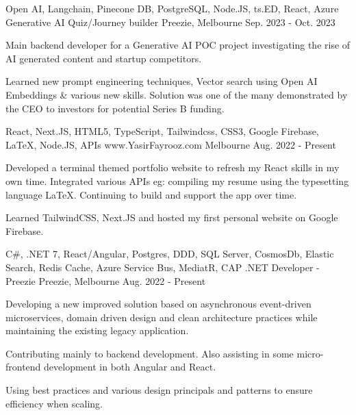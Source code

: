 

\vspace{-0.5\baselineskip}
\begin{cventries}
  \cventry
  {Open AI, Langchain, Pinecone DB, PostgreSQL, Node.JS, ts.ED, React, Azure}
  {Generative AI Quiz/Journey builder}
  {Preezie, Melbourne}
  {Sep. 2023 - Oct. 2023}
  {
    \begin{cvitems}
      \item {Main backend developer for a Generative AI POC project investigating the rise of AI generated content and startup competitors.}
      \item {Learned new prompt engineering techniques, Vector search using Open AI Embeddings & various new skills. Solution was one of the many demonstrated by the CEO to investors for potential Series B funding.}
    \end{cvitems}
  }
  \cventry
    {React, Next.JS, HTML5, TypeScript, Tailwindcss, CSS3, Google Firebase, LaTeX, Node.JS, APIs }
    {www.YasirFayrooz.com}
    {Melbourne}
    {Aug. 2022 - Present}
    {
      \begin{cvitems}
        \item {Developed a terminal themed portfolio website to refresh my React skills in my own time. Integrated various APIs eg: compiling my resume using the typesetting language LaTeX. Continuing to build and support the app over time.}
        \item {Learned TailwindCSS, Next.JS and hosted my first personal website on Google Firebase.}
      \end{cvitems}
    }
  \cventry
    {C\#, .NET 7, React/Angular, Postgres, DDD, SQL Server, CosmosDb, Elastic Search, Redis Cache, Azure Service Bus, MediatR, CAP}
    {.NET Developer - Preezie}
    {Preezie, Melbourne}
    {Aug. 2022 - Present}
    {
      \begin{cvitems}
        \item {Developing a new improved solution based on asynchronous event-driven microservices, domain driven design and clean architecture practices while maintaining the existing legacy application.}
        \item {Contributing mainly to backend development. Also assisting in some micro-frontend development in both Angular and React.}
        \item {Using best practices and various design principals and patterns to ensure efficiency when scaling.}
	  \end{cvitems}
}
\end{cventries}
